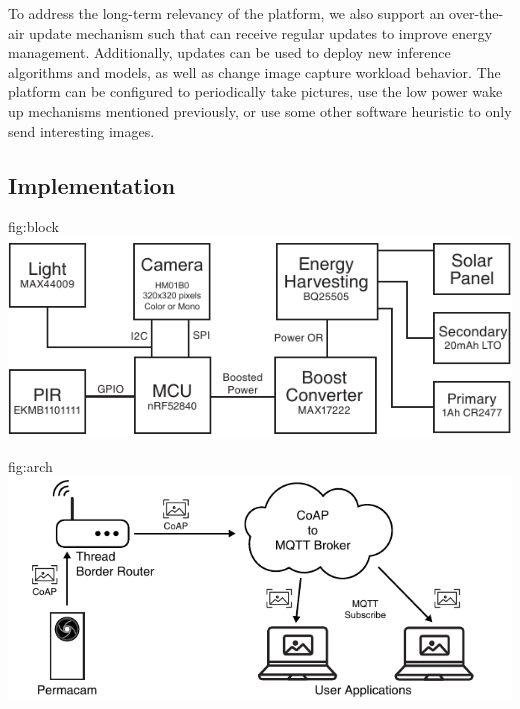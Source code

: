 To address the long-term relevancy of the platform, we also support an over-the-air update mechanism such that \namec can receive regular updates to improve energy management. Additionally, updates can be used to deploy new inference algorithms and models, as well as change image capture workload behavior. The platform can be configured to periodically take pictures, use the low power wake up mechanisms mentioned previously, or use some other software heuristic to only send interesting images.

\subsection{\namec Implementation}
\begin{definefigure}{fig:block}
\includegraphics[width=\columnwidth]{figs/permacam/figs/block_diagram.pdf}
\caption{\name system block diagram.
The system is based on the Himax HM01B0 camera and the Nordic NRF52840 MCU. We include a light and PIR sensor to provide a low power wake up mechanism to drive image capture. A hierarchical energy harvesting system with a rechargeable and non-rechargeable battery are utilized to provide a long, reliable lifetime to the system.
}
\end{definefigure}

\begin{definefigure}{fig:arch}
\centering
\includegraphics[width=\columnwidth]{figs/permacam/figs/arch.pdf}
\caption{The \namec end-to-end image transfer architecture. \namec uses OpenThread, a 6LoWPAN network. This allows it to transmit images over the CoAP block protocol directly to any IP endpoint. We implement a CoAP server to receive and reassemble image, demosaic them, and publish them over an MQTT stream. This CoAP server can be local to the sensors if privacy is desired. User applications running on PCs or on servers can easily subscribe to incoming images.
}
\end{definefigure}


